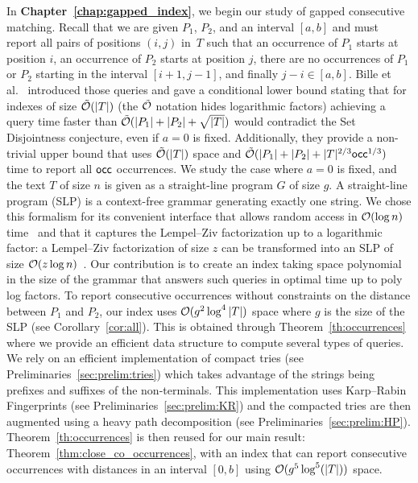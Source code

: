 In \textbf{Chapter~\ref{chap:gapped_index}}, we begin our study of gapped consecutive matching. Recall that we are given $P_1$, $P_2$, and an interval $[a,b]$ and must report all pairs of positions $(i,j)$ in~$T$ such that an occurrence of $P_1$ starts at position $i$, an occurrence of $P_2$ starts at position $j$, there are no occurrences of $P_1$ or $P_2$ starting in the interval $[i+1,j-1]$, and finally $j-i \in [a,b]$.
Bille et al.~\cite{bille2022gapped} introduced those queries and gave a conditional lower bound stating that for indexes of size $\tilde {\mathcal{O}}(|T|)$ (the $\tilde {\mathcal{O}}$ notation hides logarithmic factors) achieving a query time faster than $\tilde {\mathcal{O}}(|P_1|+|P_2|+\sqrt{|T|})$ would contradict the Set Disjointness conjecture, even if $a=0$ is fixed. Additionally, they provide a non-trivial upper bound that uses $\tilde {\mathcal{O}}(|T|)$ space and $\tilde {\mathcal{O}} (|P_1| +|P_2| + |T|^{2/3}\mathsf{occ}^{1/3})$ time to report all $\mathsf{occ}$ occurrences. 
We study the case where $a=0$ is fixed, and the text $T$ of size $n$ is given as a straight-line program $G$ of size $g$. A straight-line program (SLP) is a context-free grammar generating exactly one string. We chose this formalism for its convenient interface that allows random access in $\mathcal{O}(\log n)$ time~\cite{random_access_grammar_compress} and that it captures the  Lempel--Ziv factorization up to a logarithmic factor: a Lempel--Ziv factorization of size $z$ can be transformed into an SLP of size $\mathcal{O}(z\log n)$~\cite{CharikarLLPPRSS02,Rytter02}.
%
Our contribution is to create an index taking space polynomial in the size of the grammar that answers such queries in optimal time up to poly log factors.
To report consecutive occurrences without constraints on the distance between $P_1$ and $P_2$, our index uses $\mathcal{O}(g^2\log^4|T|)$ space where $g$ is the size of the SLP (see Corollary~\ref{cor:all}).
This is obtained through Theorem~\ref{th:occurrences} where we provide an efficient data structure to compute several types of queries. We rely on an efficient implementation of compact tries (see Preliminaries~\ref{sec:prelim:tries}) which takes advantage of the strings being prefixes and suffixes of the non-terminals. This implementation uses Karp--Rabin Fingerprints (see Preliminaries~\ref{sec:prelim:KR}) and the compacted tries are then augmented using a heavy path decomposition (see Preliminaries~\ref{sec:prelim:HP}).
Theorem~\ref{th:occurrences} is then reused for our main result: Theorem~\ref{thm:close_co_occurrences}, with an index that can report consecutive occurrences with distances in an interval $[0,b]$ using $\mathcal{O} (g^5\log^5(|T|))$ space.
